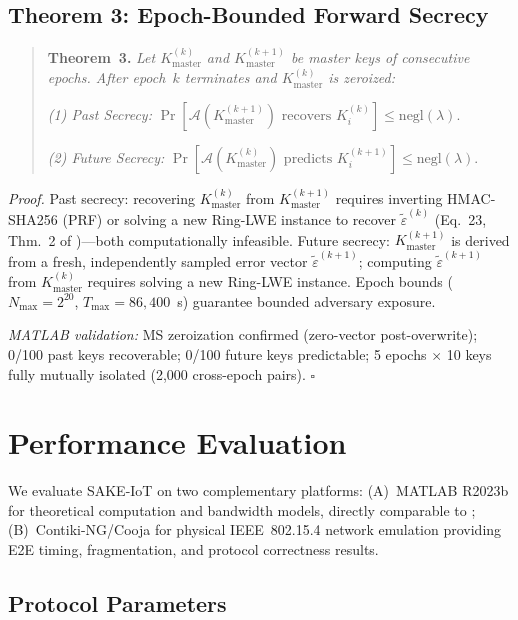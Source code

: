\documentclass[conference]{IEEEtran}
\newcommand{\Kmaster}{K_{\mathrm{master}}}
\newcommand{\Nmax}{N_{\max}}
\newcommand{\Tmax}{T_{\max}}
\begin{document}
\subsection{Theorem 3: Epoch-Bounded Forward Secrecy}

\begin{quote}
\textbf{Theorem~3.}
\label{thm:ebfs}
\textit{Let $\Kmaster^{(k)}$ and $\Kmaster^{(k+1)}$ be master keys of
consecutive epochs. After epoch~$k$ terminates and
$\Kmaster^{(k)}$ is zeroized:}

\textit{(1) Past Secrecy:}
$\Pr[\mathcal{A}(\Kmaster^{(k+1)}) \text{ recovers } K_i^{(k)}]
\leq \mathrm{negl}(\lambda)$.

\textit{(2) Future Secrecy:}
$\Pr[\mathcal{A}(\Kmaster^{(k)}) \text{ predicts } K_i^{(k+1)}]
\leq \mathrm{negl}(\lambda)$.
\end{quote}

\textit{Proof.} Past secrecy: recovering $\Kmaster^{(k)}$ from
$\Kmaster^{(k+1)}$ requires inverting HMAC-SHA256 (PRF) or solving a
new Ring-LWE instance to recover $\tilde{\varepsilon}^{(k)}$
(Eq.~23, Thm.~2 of \cite{kumari2022})---both computationally
infeasible. Future secrecy: $\Kmaster^{(k+1)}$ is derived from a
fresh, independently sampled error vector
$\tilde{\varepsilon}^{(k+1)}$; computing
$\tilde{\varepsilon}^{(k+1)}$ from $\Kmaster^{(k)}$ requires
solving a new Ring-LWE instance. Epoch bounds
($\Nmax = 2^{20}$, $\Tmax = 86{,}400$~s) guarantee bounded
adversary exposure.

\textit{MATLAB validation:} MS zeroization confirmed (zero-vector
post-overwrite); 0/100 past keys recoverable; 0/100 future keys
predictable; 5 epochs $\times$ 10 keys fully mutually isolated
(2,000 cross-epoch pairs). \hfill$\square$

\section{Performance Evaluation}
\label{sec:eval}

We evaluate SAKE-IoT on two complementary platforms: (A)~MATLAB
R2023b for theoretical computation and bandwidth models, directly
comparable to \cite{kumari2022}; (B)~Contiki-NG/Cooja for physical
IEEE~802.15.4 network emulation providing E2E timing, fragmentation,
and protocol correctness results.

\subsection{Protocol Parameters}
\end{document}
